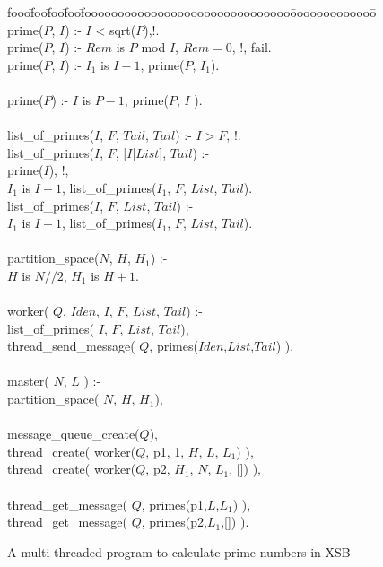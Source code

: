 \begin{figure}
\begin{center}
\begin{tt}
\begin{tabbing}
fooo\=foo\=foo\=foo\=fooooooooooooooooooooooooooooooo\=ooooooooooooo\=\kill
prime($P$, $I$) :- $I$ < sqrt($P$),!.\\
prime($P$, $I$) :- $Rem$ is $P$ mod $I$, $Rem = 0$, !, fail.\\
prime($P$, $I$) :- $I_1$ is $I - 1$, prime($P$, $I_1$).\\
\\
prime($P$) :- $I$ is $P - 1$, prime($P$, $I$ ).\\
\\
list\_of\_primes($I$, $F$, $Tail$, $Tail$) :- $I > F$, !.\\
list\_of\_primes($I$, $F$, [$I$|$List$], $Tail$) :-\\
\>        prime($I$), !,\\
\>        $I_1$ is $I + 1$, list\_of\_primes($I_1$, $F$, $List$, $Tail$).\\
list\_of\_primes($I$, $F$, $List$, $Tail$) :-\\
\>        $I_1$ is $I + 1$, list\_of\_primes($I_1$, $F$, $List$, $Tail$).\\
\\
partition\_space($N$, $H$, $H_1$) :-\\
\>        $H$ is $N//2$, $H_1$ is $H + 1$.\\
\\
worker( $Q$, $Iden$, $I$, $F$, $List$, $Tail$) :-\\
\>        list\_of\_primes( $I$, $F$, $List$, $Tail$),\\
\>        thread\_send\_message( $Q$, primes($Iden$,$List$,$Tail$) ).\\
\\
master( $N$, $L$ )  :-\\
\>        partition\_space( $N$, $H$, $H_1$),\\
\\
\>       message\_queue\_create($Q$),\\
\>        thread\_create( worker($Q$, p1, 1,  $H$, $L$,  $L_1$) ),\\
\>        thread\_create( worker($Q$, p2, $H_1$, $N$, $L_1$, []) ),\\
\\
\>        thread\_get\_message( $Q$, primes(p1,$L$,$L_1$) ),\\
\>        thread\_get\_message( $Q$, primes(p2,$L_1$,[]) ).
\end{tabbing}
\end{tt}
\end{center}
\caption{A multi-threaded program to calculate prime numbers in XSB}
\label{fig:ex-primes}
\end{figure}


